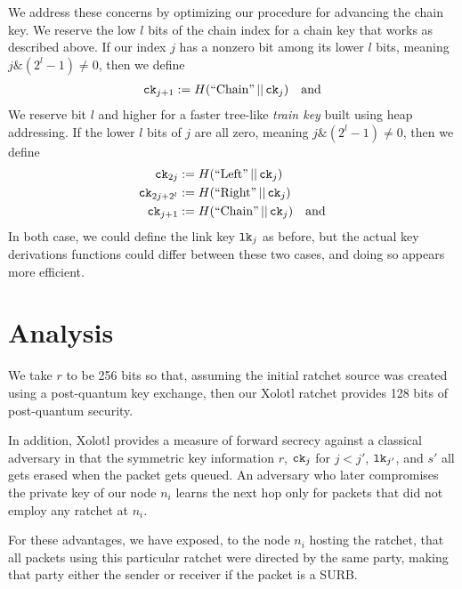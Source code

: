 \documentclass[twoside,letterpaper]{llncs}
\def\mathcomma{}
\begin{document}
We address these concerns by optimizing our procedure for advancing
the chain key.  We reserve the low $l$ bits of the chain index
for a chain key that works as described above.  
If our index $j$ has a nonzero bit among its lower $l$ bits,
meaning $j \& (2^l-1) \neq 0$, then
we define
\[ \begin{aligned}
 \ck_{j+1} &:= H(\textrm{``Chain''} \,||\, \ck_j) \quad\textrm{and} \\ %
\end{aligned} \]
We reserve bit $l$ and higher for a faster tree-like {\it train key}
built using heap addressing.  If the lower $l$ bits of $j$ are
all zero, meaning $j \& (2^l-1) \neq 0$, then we define 
\[ \begin{aligned}
 \ck_{2j} &:= H(\textrm{``Left''} \,||\, \ck_j) \mathcomma \\
 \ck_{2j+2^l} &:= H(\textrm{``Right''} \,||\, \ck_j) \mathcomma \\
 \ck_{j+1} &:= H(\textrm{``Chain''} \,||\, \ck_j) \quad\textrm{and} \\
\end{aligned} \]
In both case, we could define the link key $\texttt{lk}_j$ as before, but
the actual key derivations functions could differ between these two
cases, and doing so appears more efficient.


\section{Analysis}

We take $r$ to be 256 bits so that, assuming the initial ratchet
source was created using a post-quantum key exchange, then our
Xolotl ratchet provides 128 bits of post-quantum security.

In addition, Xolotl provides a measure of forward secrecy against
a classical adversary in that the symmetric key information $r$,
$\texttt{ck}_j$ for $j<j'$, $\texttt{lk}_{j'}$, and $s'$ all gets erased when
the packet gets queued.  An adversary who later compromises the
private key of our node $n_i$ learns the next hop only for packets
that did not employ any ratchet at $n_i$.

For these advantages, we have exposed,
 to the node $n_i$ hosting the ratchet, that all packets using this
particular ratchet were directed by the same party, making that
party either the sender or receiver if the packet is a SURB.
\end{document}
